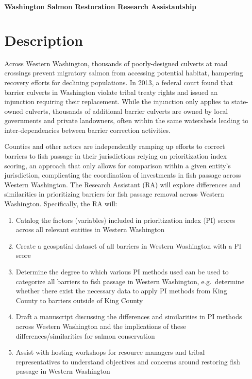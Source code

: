 \documentclass[12pt]{elsarticle}
\begin{document}
	
	\begin{center} \textbf{Washington Salmon Restoration Research Assistantship} \end{center}

\section*{Description}

			Across Western Washington, thousands of poorly-designed culverts at road crossings prevent migratory salmon from accessing potential habitat, hampering recovery efforts for declining populations. In 2013, a federal court found that barrier culverts in Washington violate tribal treaty rights and issued an injunction requiring their replacement. While the injunction only applies to state-owned culverts, thousands of additional barrier culverts are owned by local governments and private landowners, often within the same watersheds leading to inter-dependencies between barrier correction activities. 
			
			Counties and other actors are independently ramping up efforts to correct barriers to fish passage in their jurisdictions relying on prioritization index scoring, an approach that only allows for comparison within a given entity's jurisdiction, complicating the coordination of investments in fish passage across Western Washington. The Research Assistant (RA) will explore differences and similarities in prioritizing barriers for fish passage removal across Western Washington. Specifically, the RA will:
			
			\begin{enumerate}
			\item Catalog the factors (variables) included in prioritization index (PI) scores across all relevant entities in Western Washington
			\item Create a geospatial dataset of all barriers in Western Washington with a PI score 
			\item Determine the degree to which various PI methods used can be used to categorize all barriers to fish passage in Western Washington, e.g.\ determine whether there exist the necessary data to apply PI methods from King County to barriers outside of King County
			\item Draft a manuscript discussing the differences and similarities in PI methods across Western Washington and the implications of these differences/similarities for salmon conservation
			\item Assist with hosting workshops for resource managers and tribal representatives to understand objectives and concerns around restoring fish passage in Western Washington
			\end{enumerate}
\end{document}
